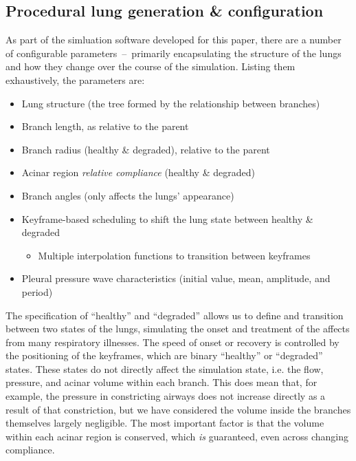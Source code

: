 \subsection{Procedural lung generation \& configuration}

As part of the simluation software developed for this paper, there are a number of configurable
parameters~--~primarily encapsulating the structure of the lungs and how they change over the course
of the simulation. Listing them exhaustively, the parameters are:

\begin{itemize}
\item Lung structure (the tree formed by the relationship between branches)
\item Branch length, as relative to the parent
\item Branch radius (healthy \& degraded), relative to the parent
\item Acinar region \textit{relative compliance} (healthy \& degraded)
\item Branch angles (only affects the lungs' appearance)
\item Keyframe-based scheduling to shift the lung state between healthy \& degraded
    \begin{itemize}
    \item Multiple interpolation functions to transition between keyframes
    \end{itemize}
\item Pleural pressure wave characteristics (initial value, mean, amplitude, and period)
\end{itemize}

The specification of ``healthy'' and ``degraded'' allows us to define and transition between two
states of the lungs, simulating the onset and treatment of the affects from many respiratory
illnesses. The speed of onset or recovery is controlled by the positioning of the keyframes, which
are binary ``healthy'' or ``degraded'' states. These states do not directly affect the simulation
state, i.e. the flow, pressure, and acinar volume within each branch. This does mean that, for
example, the pressure in constricting airways does not increase directly as a result of that
constriction, but we have considered the volume inside the branches themselves largely negligible.
The most important factor is that the volume within each acinar region is conserved, which
\textit{is} guaranteed, even across changing compliance.

\breakpars

